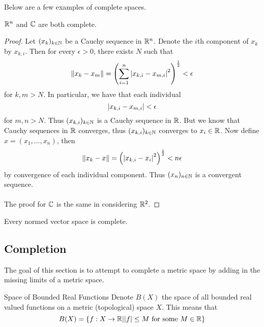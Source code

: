 \documentclass[a4paper]{article}
\begin{document}
Below are a few examples of complete spaces. 

\begin{prp}{}{} $\mathbb{R}^n$ and $\mathbb{C}$ are both complete. \tcbline
\begin{proof}
Let $(x_k)_{k\in\mathbb{N}}$ be a Cauchy sequence in $\mathbb{R}^n$. Denote the $i$th component of $x_k$ by $x_{k,i}$. Then for every $\epsilon>0$, there exists $N$ such that $$\|x_k-x_m\|=\left(\sum_{i=1}^n\abs{x_{k,i}-x_{m,i}}^2\right)^{\frac{1}{2}}<\epsilon$$ for $k,m>N$. In particular, we have that each individual $$\abs{x_{k,i}-x_{m,i}}<\epsilon$$ for $m,n>N$. Thus $(x_{k,i})_{k\in\mathbb{N}}$ is a Cauchy sequence in $\mathbb{R}$. But we know that Cauchy sequences in $\mathbb{R}$ converges, thus $(x_{k,i})_{k\in\mathbb{N}}$ converges to $x_i\in\mathbb{R}$. Now define $x=(x_1,\dots,x_n)$, then $$\|x_k-x\|=\left(\abs{x_{k,i}-x_i}^2\right)^{\frac{1}{2}}<n\epsilon$$ by convergence of each individual component. Thus $(x_n)_{n\in\mathbb{N}}$ is a convergent sequence. \\~\\
The proof for $\mathbb{C}$ is the same in considering $\mathbb{R}^2$. 
\end{proof}
\end{prp}

\begin{prp}{}{} Every normed vector space is complete. 
\end{prp}

\subsection{Completion}
The goal of this section is to attempt to complete a metric space by adding in the missing limits of a metric space. 

\begin{defn}{Space of Bounded Real Functions}{} Denote $B(X)$ the space of all bounded real valued functions on a metric (topological) space $X$. This means that $$B(X)=\{f:X\to\mathbb{R}|\abs{f}\leq M\text{ for some }M\in\mathbb{R}\}$$
\end{defn}
\end{document}
